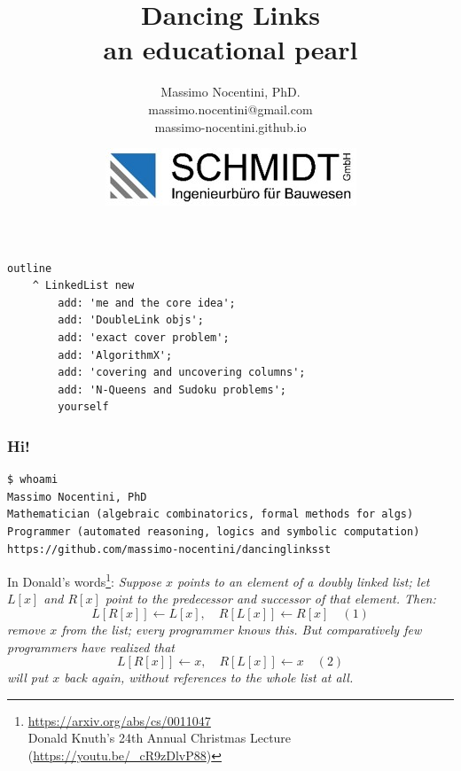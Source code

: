 \documentclass[10pt]{beamer}
\title{Dancing Links\\\small{an educational pearl}}
\author{Massimo Nocentini, PhD.\\
	\footnotesize{massimo.nocentini@gmail.com}\\
	\footnotesize{massimo-nocentini.github.io}}
\institute{ESUG2019 -- \today.}
\date{\vspace{0.5cm}\includegraphics{SchmidtLogo.jpg}}
\begin{document}
\frame{\titlepage}


\begin{frame}[fragile]
\frametitle{}
\begin{verbatim}
outline
    ^ LinkedList new
        add: 'me and the core idea';
        add: 'DoubleLink objs';
        add: 'exact cover problem';
        add: 'AlgorithmX';
        add: 'covering and uncovering columns';
        add: 'N-Queens and Sudoku problems';
        yourself
\end{verbatim}
\end{frame}

\begin{frame}[fragile]
\frametitle{Hi!}
\begin{Verbatim}[fontsize=\small]
$ whoami
Massimo Nocentini, PhD
Mathematician (algebraic combinatorics, formal methods for algs)
Programmer (automated reasoning, logics and symbolic computation)
https://github.com/massimo-nocentini/dancinglinksst
\end{Verbatim}
\vfill
In Donald's words\footnote{\url{https://arxiv.org/abs/cs/0011047}\\Donald Knuth's 24th Annual Christmas Lecture (\url{https://youtu.be/_cR9zDlvP88})}:
\emph{
Suppose $x$ points to an element of a doubly linked list;
let $L[x]$ and $R[x]$ point to the predecessor and successor
of that element. Then:
\begin{displaymath}
  L[R[x]] \leftarrow L[x],\quad R[L[x]] \leftarrow R[x] \quad(1)
\end{displaymath}
remove $x$ from the list; every programmer knows this.
But comparatively few programmers have realized that
\begin{displaymath}
  L[R[x]] \leftarrow x,\quad R[L[x]] \leftarrow x \quad(2)
\end{displaymath}
will put $x$ back again, without references to the whole list at all.
}

\end{frame}
\end{document}
